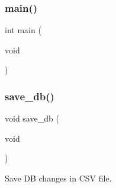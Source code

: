 \subsubsection{main()}
{\footnotesize\ttfamily int main (\begin{DoxyParamCaption}\item[{void}]{ }\end{DoxyParamCaption})}

\mbox{\label{auth_8c_afeb75f74451938ff9dc7617224f6fe3f}} 
\subsubsection{save\+\_\+db()}
{\footnotesize\ttfamily void save\+\_\+db (\begin{DoxyParamCaption}\item[{void}]{ }\end{DoxyParamCaption})}



Save DB changes in C\+SV file. 

